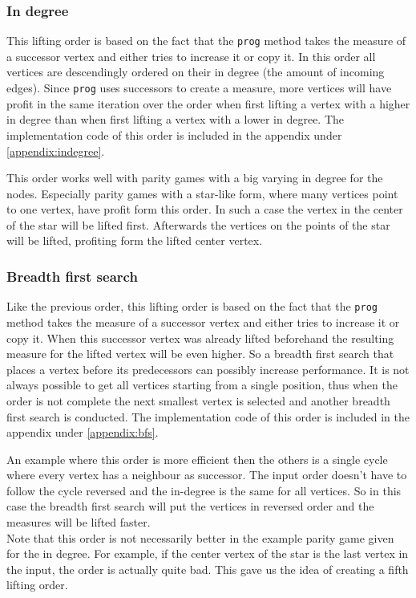 \documentclass[10pt,a4paper]{article}
\begin{document}
\subsubsection{In degree}\label{indegree}
This lifting order is based on the fact that the \texttt{prog} method takes the measure of a successor vertex and either tries to increase it or copy it. In this order all vertices are descendingly ordered on their in degree (the amount of incoming edges). Since \texttt{prog} uses successors to create a measure, more vertices will have profit in the same iteration over the order when first lifting a vertex with a higher in degree than when first lifting a vertex with a lower in degree. The implementation code of this order is included in the appendix under \ref{appendix:indegree}.


This order works well with parity games with a big varying in degree for the nodes. Especially parity games with a star-like form, where many vertices point to one vertex, have profit form this order. In such a case the vertex in the center of the star will be lifted first. Afterwards the vertices on the points of the star will be lifted, profiting form the lifted center vertex.

\subsubsection{Breadth first search}
Like the previous order, this lifting order is based on the fact that the \texttt{prog} method takes the measure of a successor vertex and either tries to increase it or copy it. When this successor vertex was already lifted beforehand the resulting measure for the lifted vertex will be even higher. So a breadth first search that places a vertex before its predecessors can possibly increase performance. It is not always possible to get all vertices starting from a single position, thus when the order is not complete the next smallest vertex is selected and another breadth first search is conducted. The implementation code of this order is included in the appendix under \ref{appendix:bfs}.

An example where this order is more efficient then the others is a single cycle where every vertex has a neighbour as successor. The input order doesn't have to follow the cycle reversed and the in-degree is the same for all vertices. So in this case the breadth first search will put the vertices in reversed order and the measures will be lifted faster.\\
Note that this order is not necessarily better in the example parity game given for the in degree. For example, if the center vertex of the star is the last vertex in the input, the order is actually quite bad. This gave us the idea of creating a fifth lifting order.
\end{document}
